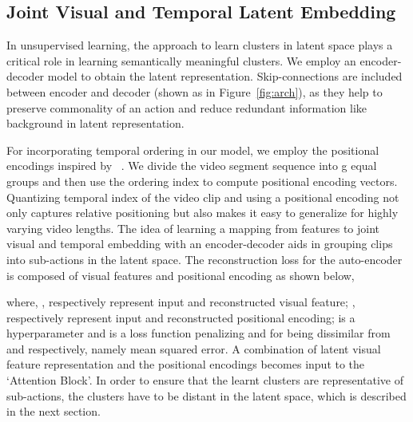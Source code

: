 \documentclass[final]{cvpr}
\begin{document}
\subsection{Joint Visual and Temporal Latent Embedding}
\label{sec:jvtl}
\par In unsupervised learning, the approach to learn clusters in latent space plays a critical role in learning semantically meaningful clusters.
We employ an encoder-decoder model to obtain the latent representation.
Skip-connections are included between encoder and decoder (shown as  in Figure~\ref{fig:arch}), as they help to preserve commonality of an action and reduce redundant information like background in latent representation.

For incorporating temporal ordering in our model, we employ the positional encodings inspired by ~\cite{vaswani2017attention}.
We divide the video segment sequence into g equal groups and then use the ordering index to compute positional encoding vectors. Quantizing  temporal index of the video clip and using a positional encoding not only captures relative positioning but also makes it easy to generalize for highly varying video lengths. The idea of learning a mapping from features to joint visual and temporal embedding with an encoder-decoder aids in grouping clips into sub-actions in the latent space. The reconstruction loss for the auto-encoder is composed of visual features and positional encoding as shown below,

where, ,  respectively represent input and  reconstructed visual feature; ,  respectively represent input and reconstructed positional encoding;  is a hyperparameter and   is a loss function penalizing  and  for being dissimilar from  and  respectively, namely mean squared error. A combination of latent visual feature representation and the positional encodings becomes input to the `Attention Block'. In order to ensure that the learnt clusters are representative of sub-actions, the clusters have to be distant in the latent space, which is described in the next section.
\end{document}
